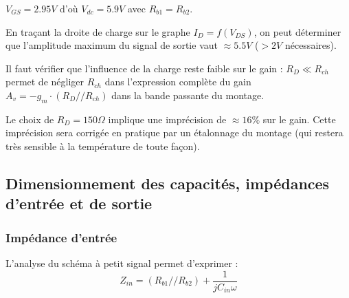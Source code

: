 \documentclass[11pt,a4paper]{article}
\theoremstyle{definition}%
\begin{document}
{$V_{GS}=2.95V$ d'où $V_{dc}=5.9V$ avec $R_{b1}=R_{b2}$.

En traçant la droite de charge sur le graphe $I_D=f\left(V_{DS}\right)$, on peut déterminer que l'amplitude maximum du signal de sortie vaut $\approx 5.5V$ ($>2V$ nécessaires).

Il faut vérifier que l'influence de la charge reste faible sur le gain : $R_D\ll R_{ch}$ permet de négliger $R_{ch}$ dans l'expression complète du gain $A_v=-g_m\cdot \left( R_D//R_{ch} \right)$ dans la bande passante du montage.

Le choix de $R_D=150\Omega$ implique une imprécision de $\approx 16\%$ sur le gain. %
Cette imprécision sera corrigée en pratique par un étalonnage du montage (qui restera très sensible à la température de toute façon).

\begin{center}
\end{center}
%
%
%
%
%
%
%
%
%
%
%

\subsection{Dimensionnement des capacités, impédances d'entrée et de sortie}

\subsubsection{Impédance d'entrée}
L'analyse du schéma à petit signal permet d'exprimer : $$Z_{in}=(R_{b1}//R_{b2})+\frac{1}{jC_{in}\omega}$$

}
\end{document}

